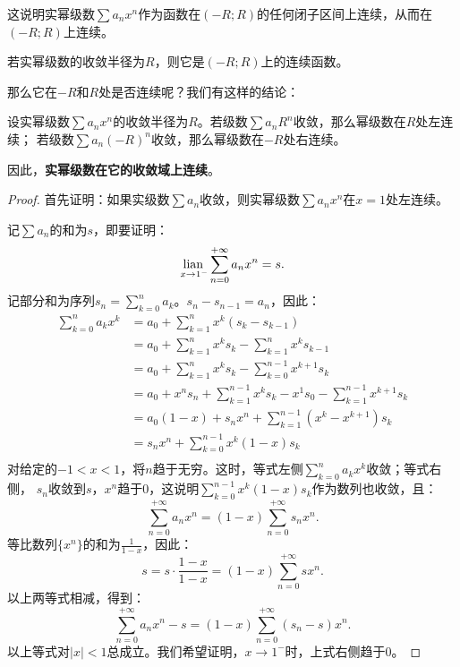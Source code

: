 \documentclass[12pt,UTF8]{ctexbook}
\begin{document}
\begin{appendix}
这说明实幂级数$\sum a_n x^n$作为函数在$(-R;R)$的任何闭子区间上连续，从而在$(-R;R)$上连续。

\begin{tm}\label{tm:c-4-0}
    若实幂级数的收敛半径为$R$，则它是$(-R;R)$上的连续函数。
\end{tm}

那么它在$-R$和$R$处是否连续呢？我们有这样的结论：

\begin{tm}\label{tm:c-4-10}
    设实幂级数$\sum a_n x^n$的收敛半径为$R$。若级数$\sum a_n R^n$收敛，那么幂级数在$R$处左连续；
    若级数$\sum a_n (-R)^n$收敛，那么幂级数在$-R$处右连续。
\end{tm}

因此，\textbf{实幂级数在它的收敛域上连续}。

\begin{proof}
    首先证明：如果实级数$\sum a_n$收敛，则实幂级数$\sum a_n x^n$在$x = 1$处左连续。

    记$\sum a_n$的和为$s$，即要证明：
    $$ \underset{x\to 1^-}{\operatorname{lian}\,} \sum_{n=0}^{+\infty}a_n x^n = s. $$
    记部分和为序列$ s_n = \sum_{k=0}^{n} a_k$。$s_{n} - s_{n-1} = a_n$，因此：
    \begin{align*}
        \sum_{k=0}^{n} a_k x^k &= a_0 + \sum_{k=1}^{n} x^k (s_k - s_{k-1}) \\
        &= a_0 + \sum_{k=1}^{n} x^k s_k - \sum_{k=1}^{n} x^k s_{k-1} \\
        &= a_0 + \sum_{k=1}^{n} x^k s_k - \sum_{k=0}^{n-1} x^{k+1} s_k \\
        &= a_0 + x^n s_n + \sum_{k=1}^{n-1} x^k s_k - x^1 s_0 - \sum_{k=1}^{n-1} x^{k+1} s_k \\
        &= a_0(1 - x) + s_n x^n + \sum_{k=1}^{n-1} (x^k - x^{k+1}) s_k \\
        &= s_n x^n + \sum_{k=0}^{n-1} x^k(1 - x) s_k \\
    \end{align*}
    对给定的$-1<x<1$，将$n$趋于无穷。这时，等式左侧$\sum_{k=0}^{n} a_k x^k$收敛；等式右侧，
    $s_n$收敛到$s$，$x^n$趋于$0$，这说明$\sum_{k=0}^{n-1} x^k(1 - x) s_k$作为数列也收敛，且：
    $$ \sum_{n=0}^{+\infty}a_n x^n = (1 - x)\sum_{n=0}^{+\infty}s_n x^n.$$
    等比数列$\{x^n\}$的和为$\frac{1}{1 - x}$，因此：
    $$ s = s \cdot \frac{1 - x}{1 - x} = (1 - x)\sum_{n=0}^{+\infty} s x^n. $$
    以上两等式相减，得到：
    $$ \sum_{n=0}^{+\infty}a_n x^n - s = (1 - x)\sum_{n=0}^{+\infty}(s_n - s) x^n.$$
    以上等式对$|x|<1$总成立。我们希望证明，$x\to 1^-$时，上式右侧趋于$0$。


\end{proof}
\end{appendix}
\end{document}
